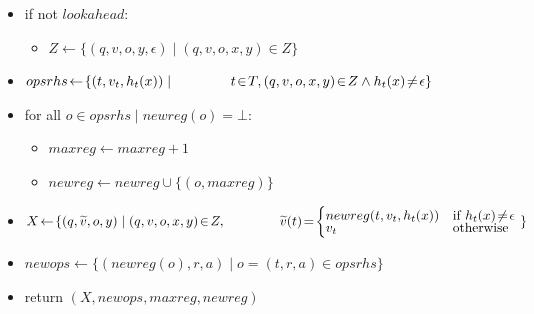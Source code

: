 \documentclass{article}
\newcommand{\Xset}{\!\leftarrow\!}
\newcommand{\Xin}{\!\in\!}
\newcommand{\Xeq}{\!=\!}
\theoremstyle{definition}
\begin{document}
\begin{multicols}{2}
\begin{itemize}[leftmargin=0in]
        \item[] if not $lookahead$:
        \begin{itemize}
            \item[] $Z \Xset \{(q, v, o, y, \epsilon) \mid (q, v, o, x, y) \Xin Z \}$
        \end{itemize}

        \smallskip
        \item[] $opsrhs \Xset \{ (t, v_t, h_t(x)) \mid \\
            \hphantom{\hspace{4em}} t \Xin T, (q, v, o, x, y) \Xin Z \wedge h_t(x)\!\neq\!\epsilon \}$

        \item[] for all $o \Xin opsrhs \mid newreg(o) \Xeq \bot:$
        \begin{itemize}
            \item[] $maxreg \Xset maxreg + 1$
            \item[] $newreg \Xset newreg \cup \{(o, maxreg)\}$
        \end{itemize}

        \item[] $X \Xset \{(q, \widetilde{v}, o, y) \mid (q, v, o, x, y) \Xin Z,\\
            \hphantom{\hspace{4em}} \widetilde{v}(t) \Xeq
                \begin{cases}
                    newreg(t, v_t, h_t(x)) & \text{if } h_t(x)\!\neq\!\epsilon \\[-0.5em]
                    v_t & \text{otherwise}
                \end{cases} \; \}$

        \item[] $newops \Xset \{(newreg(o), r, a) \mid o \Xeq (t, r, a) \Xin opsrhs\}$

        \item[] return $(X, newops, maxreg, newreg)$
        \\ \\
    \end{itemize}



\end{multicols}
\end{document}
